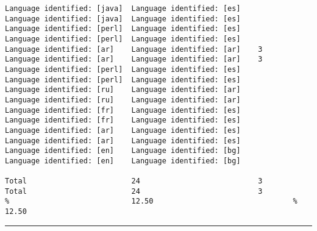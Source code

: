 \begin{verbatim}
Language identified: [java]  Language identified: [es]            Language identified: [java]  Language identified: [es]
Language identified: [perl]  Language identified: [es]            Language identified: [perl]  Language identified: [es]
Language identified: [ar]    Language identified: [ar]    3       Language identified: [ar]    Language identified: [ar]    3
Language identified: [perl]  Language identified: [es]            Language identified: [perl]  Language identified: [es]
Language identified: [ru]    Language identified: [ar]            Language identified: [ru]    Language identified: [ar]
Language identified: [fr]    Language identified: [es]            Language identified: [fr]    Language identified: [es]
Language identified: [ar]    Language identified: [es]            Language identified: [ar]    Language identified: [es]
Language identified: [en]    Language identified: [bg]            Language identified: [en]    Language identified: [bg]

Total                        24                           3       Total                        24                           3
%                            12.50                                %                            12.50
\end{verbatim}
\vskip4pt\hrule

